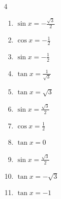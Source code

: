 \begin{multicols}{4}
\begin{enumerate}
  \item $\displaystyle \sin{x}  = -\frac{\sqrt{3}}{2}$


  \item $\displaystyle \cos{x}  = -\frac{1}{2}$


  \item $\displaystyle \sin{x}  = -\frac{1}{2}$


\columnbreak %

  \item $\displaystyle \tan{x}  = \frac{1}{\sqrt{3}}$


  \item $\displaystyle \tan{x}  = \sqrt{3}$


  \item $\displaystyle \sin{x}  = \frac{\sqrt{3}}{2}$


  \item $\displaystyle \cos{x}  = \frac{1}{2}$


  \item $\displaystyle \tan{x}  = 0$

        \phantom{$\displaystyle x = 0 , \pi$}

  \item $\displaystyle \sin{x}  = \frac{\sqrt{3}}{2}$


  \item $\displaystyle \tan{x}  = -\sqrt{3}$


  \item $\displaystyle \tan{x}  = -1$



\end{enumerate}
\end{multicols}
